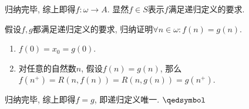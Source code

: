 \documentclass[UTF8]{ctexart}
\begin{document}



归纳完毕, 综上即得$f:\omega\to A$. 显然$f\in S$表示$f$满足递归定义的要求.


假设$f,g$都满足递归定义的要求, 归纳证明$\forall n\in\omega:f(n)=g(n)$.

\begin{enumerate}
    \item $f(0)=x_0=g(0)$.
    \item 对任意的自然数$n$, 假设$f(n)=g(n)$,
    那么$f(n^+)=R(n,f(n))=R(n,g(n))=g(n^+)$.
\end{enumerate}

归纳完毕, 综上即得$f=g$, 即递归定义唯一. \hfill $\qedsymbol$
\end{document}
